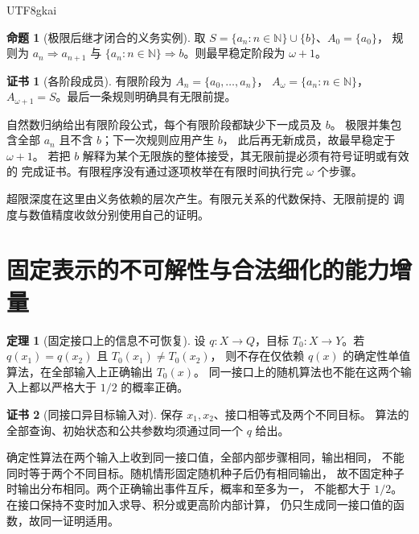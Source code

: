 \documentclass[12pt]{report}
\makeatletter
\theoremstyle{definition}
\newtheorem{theorem}{定理}[chapter]
\newtheorem{proposition}{命题}[chapter]
\newtheorem{Certificate}{证书}[chapter]
\renewenvironment{proof}[1][\proofname]{\par
  \pushQED{\qed}\normalfont
  \topsep6\p@\@plus6\p@\relax
  \trivlist
  \item[\hskip\labelsep\normalfont #1\@addpunct{.}]\ignorespaces
}{
  \popQED\endtrivlist\@endpefalse
}
\newcommand{\NN}{\mathbb N}
\makeatother
\begin{document}
\begin{CJK*}{UTF8}{gkai}
\begin{proposition}[极限后继才闭合的义务实例]
\label{prop:omega-successor}
取 \(S=\{a_n:n\in\NN\}\cup\{b\}\)、\(A_0=\{a_0\}\)，
规则为 \(a_n\Rightarrow a_{n+1}\) 与
\(\{a_n:n\in\NN\}\Rightarrow b\)。则最早稳定阶段为 \(\omega+1\)。
\end{proposition}
\begin{Certificate}[各阶段成员]
有限阶段为 \(A_n=\{a_0,\ldots,a_n\}\)，
\(A_\omega=\{a_n:n\in\NN\}\)，
\(A_{\omega+1}=S\)。最后一条规则明确具有无限前提。
\end{Certificate}
\begin{proof}
自然数归纳给出有限阶段公式，每个有限阶段都缺少下一成员及 \(b\)。
极限并集包含全部 \(a_n\) 且不含 \(b\)；下一次规则应用产生 \(b\)，
此后再无新成员，故最早稳定于 \(\omega+1\)。
若把 \(b\) 解释为某个无限族的整体接受，其无限前提必须有符号证明或有效的
完成证书。有限程序没有通过逐项枚举在有限时间执行完 \(\omega\) 个步骤。
\end{proof}
超限深度在这里由义务依赖的层次产生。有限元关系的代数保持、无限前提的
调度与数值精度收敛分别使用自己的证明。

\section{固定表示的不可解性与合法细化的能力增量}
\begin{theorem}[固定接口上的信息不可恢复]
\label{thm:fixed-interface-limit}
设 \(q:X\to Q\)，目标 \(T_0:X\to Y\)。若
\(q(x_1)=q(x_2)\) 且 \(T_0(x_1)\ne T_0(x_2)\)，
则不存在仅依赖 \(q(x)\) 的确定性单值算法，在全部输入上正确输出 \(T_0(x)\)。
同一接口上的随机算法也不能在这两个输入上都以严格大于 \(1/2\) 的概率正确。
\end{theorem}
\begin{Certificate}[同接口异目标输入对]
保存 \(x_1,x_2\)、接口相等式及两个不同目标。
算法的全部查询、初始状态和公共参数均须通过同一个 \(q\) 给出。
\end{Certificate}
\begin{proof}
确定性算法在两个输入上收到同一接口值，全部内部步骤相同，输出相同，
不能同时等于两个不同目标。随机情形固定随机种子后仍有相同输出，
故不固定种子时输出分布相同。两个正确输出事件互斥，概率和至多为一，
不能都大于 \(1/2\)。在接口保持不变时加入求导、积分或更高阶内部计算，
仍只生成同一接口值的函数，故同一证明适用。
\end{proof}


\end{CJK*}
\end{document}

